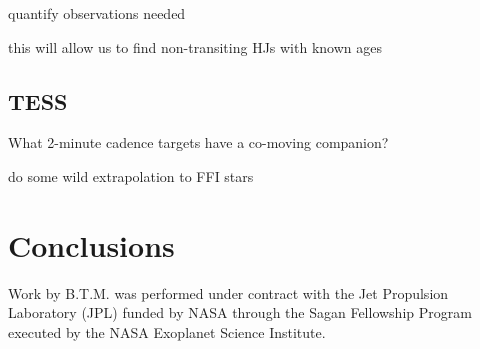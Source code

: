 \documentclass[twocolumn]{aastex62}
\begin{document}
quantify observations needed

this will allow us to find non-transiting HJs with known ages

\subsection{TESS}

What 2-minute cadence targets have a co-moving companion?

do some wild extrapolation to FFI stars%

\section{Conclusions}




\acknowledgments


Work by B.T.M. was performed under contract with the Jet Propulsion
Laboratory (JPL) funded by NASA through the Sagan Fellowship Program executed
by the NASA Exoplanet Science Institute.


 
 

\end{document}
